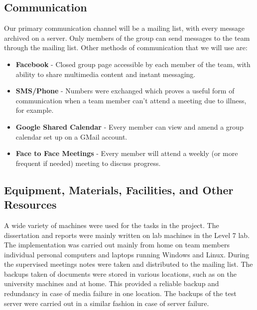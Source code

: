\documentclass{l3proj}
\begin{document}
\subsection{Communication} Our primary communication channel will be a mailing
list, with every message archived on a server. Only members of the group can
send messages to the team through the mailing list. Other methods of
communication that we will use are: \begin{itemize} \item \textbf{Facebook} -
Closed group page accessible by each member of the team, with ability to share
multimedia content and instant messaging.  \item \textbf{SMS/Phone} - Numbers
were exchanged which proves a useful form of communication when a team member
can't attend a meeting due to illness, for example.  \item \textbf{Google Shared
Calendar} - Every member can view and amend a group calendar set up on a GMail
account.  \item \textbf{Face to Face Meetings} - Every member will attend a
weekly (or more frequent if needed) meeting to discuss progress.  \end{itemize}

\subsection{Equipment, Materials, Facilities, and Other Resources} A wide
variety of machines were used for the tasks in the project. The dissertation and
reports were mainly written on lab machines in the Level 7 lab.  The
implementation was carried out mainly from home on team members individual
personal computers and laptops running Windows and Linux. \newline During the supervised meetings notes
were taken and distributed to the mailing list.  The backups taken of documents
were stored in various locations, such as on the university machines and at
home. This provided a reliable backup and redundancy in case of media failure in
one location. The backups of the test server were carried out in a similar
fashion in case of server failure.
\end{document}
